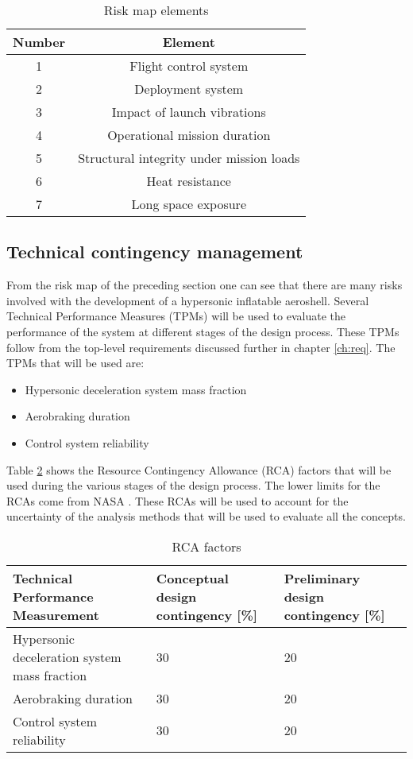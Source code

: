 \begin{table}[h]
\centering
\caption{Risk map elements}
\label{tab:riskelements}
\begin{tabular}{|c|c|}
\hline
\textbf{Number} & \textbf{Element} \\
\hline
1 & Flight control system\\
2 & Deployment system\\
3 & Impact of launch vibrations\\
4 & Operational mission duration\\
5 & Structural integrity under mission loads\\
6 & Heat resistance\\
7 & Long space exposure\\
\hline
\end{tabular}
\end{table}

\subsection{Technical contingency management}
\label{sec:tca}
From the risk map of the preceding section one can see that there are many risks involved with the development of a hypersonic inflatable aeroshell. Several Technical Performance Measures (TPMs) will be used to evaluate the performance of the system at different stages of the design process. These TPMs follow from the top-level requirements discussed further in chapter \ref{ch:req}. The TPMs that will be used are:
\begin{itemize}
	\item Hypersonic deceleration system mass fraction
	\item Aerobraking duration
	\item Control system reliability
\end{itemize}
Table \ref{tab:tpm} shows the Resource Contingency Allowance (RCA) factors that will be used during the various stages of the design process. The lower limits for the RCAs come from NASA \cite{GoddardSpaceFlightCenter2013}. These RCAs will be used to account for the uncertainty of the analysis methods that will be used to evaluate all the concepts.

\begin{table}[h]
	\centering
	\caption{RCA factors}
	\label{tab:tpm}
	\begin{tabular}{|p{}|p{}|p{}|}
		\hline
		\textbf{Technical Performance Measurement} & \textbf{Conceptual design contingency [\%]} & \textbf{Preliminary design contingency [\%]} \\ \hline
		Hypersonic deceleration system mass fraction & 30 & 20 \\ \hline
		Aerobraking duration & 30 & 20 \\ \hline
		Control system reliability & 30 & 20 \\ \hline
	\end{tabular}
\end{table}